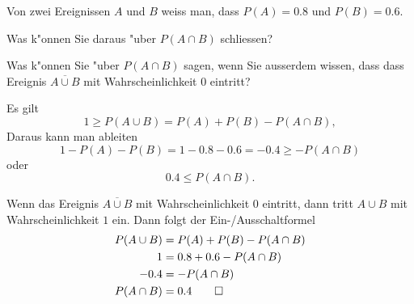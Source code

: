 Von zwei Ereignissen $A$ und $B$ weiss man, dass $P(A)=0.8$ und $P(B)=0.6$.
\begin{teilaufgaben}
\item
Was k"onnen Sie daraus "uber $P(A\cap B)$ schliessen?
\item
Was k"onnen Sie "uber $P(A\cap B)$ sagen, wenn Sie ausserdem wissen, dass 
dass Ereignis $\overline{A\cup B}$ mit Wahrscheinlichkeit $0$ eintritt?
\end{teilaufgaben}

\begin{loesung}
\begin{teilaufgaben}
\item 
Es gilt
\[
1\ge P(A\cup B)=P(A)+P(B)-P(A\cap B),
\]
Daraus kann man ableiten
\[
1-P(A)-P(B)=1-0.8-0.6=-0.4 \ge -P(A\cap B)
\]
oder
\[
0.4\le P(A\cap B).
\]
\item 
Wenn das Ereignis $\overline{A\cup B}$ mit Wahrscheinlichkeit $0$ eintritt,
dann tritt $A\cup B$ mit Wahrscheinlichkeit $1$ ein.
Dann folgt der Ein-/Ausschaltformel
\begin{align*}
P(A\cup B)&=P(A)+P(B)-P(A\cap B)\\
1&=0.8+0.6-P(A\cap B)\\
-0.4&=-P(A\cap B)\\
P(A\cap B)&=0.4
\qedhere
\end{align*}
\end{teilaufgaben}
\end{loesung}

